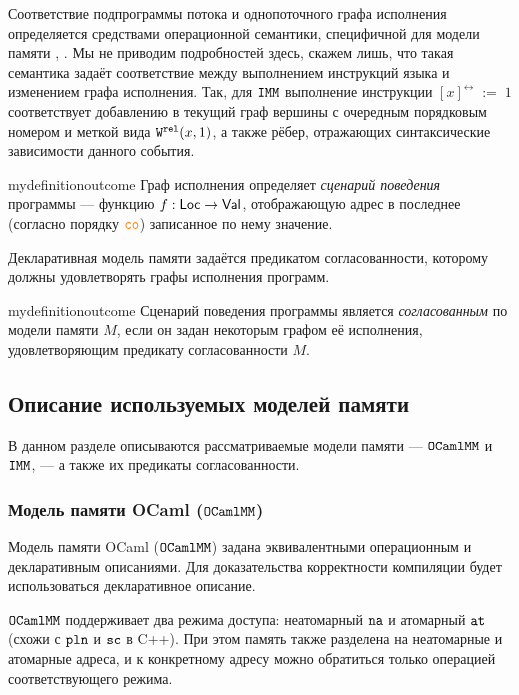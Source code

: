 Соответствие подпрограммы потока и однопоточного графа исполнения определяется средствами операционной семантики, специфичной для модели памяти \cite{omm}, \cite{imm}. Мы не приводим подробностей здесь, скажем лишь, что такая семантика задаёт соответствие между выполнением инструкций языка и изменением графа исполнения. Так, для $\mathtt{IMM}$ выполнение инструкции $[x]^{\rel}\;:=\;1$ соответствует добавлению в текущий граф вершины с очередным порядковым номером и меткой вида ${\mathtt{W}}^{\mathtt{rel}}(x, 1)$, а также рёбер, отражающих синтаксические зависимости данного события.

\begin{restatable}{mydefinition}{outcome}
  \label{definition:outcome-def}
  Граф исполнения определяет \emph{сценарий поведения} программы --- функцию ${f: \mathsf{Loc} \to \mathsf{Val}}$, отображающую адрес в последнее (согласно порядку $\lCO$) записанное по нему значение. 
\end{restatable}

Декларативная модель памяти задаётся предикатом согласованности, которому должны удовлетворять графы исполнения программ.
\begin{restatable}{mydefinition}{outcome}
  Сценарий поведения программы является \emph{согласованным} по модели памяти $M$, если он задан некоторым графом её исполнения, удовлетворяющим предикату согласованности $M$.
\end{restatable}  

\subsection{Описание используемых моделей памяти}
\label{mm-description}

В данном разделе описываются рассматриваемые модели памяти ---  $\mathtt{OCaml}\allowbreak \mathtt{MM}$ и $\mathtt{IMM}$, --- а также их предикаты
согласованности.

\subsubsection{Модель памяти OCaml ($\mathtt{OCaml}\allowbreak \mathtt{MM}$)}
\label{ocaml-mm}

Модель памяти OCaml ($\mathtt{OCaml}\allowbreak \mathtt{MM}$) \cite{omm} задана эквивалентными операционным и декларативным описаниями. Для доказательства корректности компиляции будет использоваться декларативное описание.

$\mathtt{OCaml}\allowbreak \mathtt{MM}$ поддерживает два режима доступа: неатомарный ${\mathtt{na}}$ и атомарный ${\mathtt{at}}$ (схожи с $\mathtt{pln}$ и ${\mathtt{sc}}$ в C++). При этом память также разделена на неатомарные и атомарные адреса, и к конкретному адресу можно обратиться только операцией соответствующего режима.

